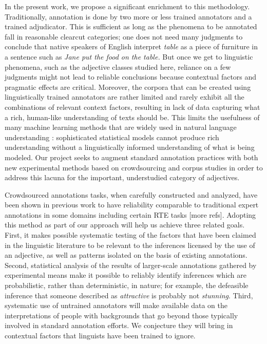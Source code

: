 \documentclass[10pt]{article}
\begin{document}
\medskip
In the present work, we propose a significant enrichment to this methodology. Traditionally, annotation is done by two more or less trained annotators and a trained adjudicator. This is sufficient as long as the phenomena to be annotated fall in reasonable clearcut categories; one does not need many judgments to conclude that native speakers of English interpret \emph{table} as a piece of furniture in a sentence such as \emph{Jane put the food on the table.} But once we get to 
linguistic phenomena, such as the adjective classes studied here, reliance on a few judgments might not lead to reliable conclusions because contextual factors and pragmatic effects are critical.  
Moreover, the corpora that can be created using linguistically trained annotators are rather limited and rarely exhibit all the combinations of relevant context factors, resulting in lack of data capturing what a rich, human-like understanding of texts should be. This limits the usefulness of many machine learning methods that are widely used in natural language understanding \cite{manning1999foundations,wasserman2004all,murphy2012machine}: sophisticated statistical models cannot produce rich understanding without a linguistically informed understanding of what is being modeled. Our project seeks to augment standard annotation practices with both new experimental methods based on crowdsourcing and corpus studies in order to address this lacuna for the important, understudied category of adjectives.

Crowdsourced annotations tasks, when carefully constructed and analyzed, have been shown in previous work to have reliability comparable to traditional expert annotations in some domains including certain RTE tasks \cite{snow:08,munroetal2010} [more refs]. Adopting this method as part of our approach will help us achieve three related goals. First, it makes possible systematic testing of the factors that have been claimed in the linguistic literature to be relevant to the inferences licensed by the use of an adjective, as well as patterns isolated on the basis of existing annotations. Second, statistical analysis of the results of larger-scale annotations gathered by experimental means make it possible to reliably identify inferences which are probabilistic, rather than deterministic, in nature; for example, the defeasible inference that someone described as \emph{attractive} is probably not \emph{stunning}. Third, systematic use of untrained annotators will make available data on the interpretations of people with backgrounds that go beyond those typically involved in standard annotation efforts. We conjecture they will bring in contextual factors that linguists have been trained to ignore.  
\end{document}
